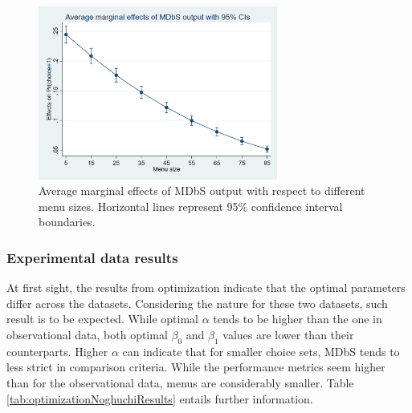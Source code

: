 \documentclass[a4paper,12pt]{article}
\begin{document}
\begin{figure}[h]
    \centering
    \includegraphics[width=0.7\textwidth]{staticFiles/marginsAmadeusGraph.png}
    \caption{Average marginal effects of MDbS output with respect to different menu sizes. Horizontal lines represent 95\% confidence interval boundaries.} %
    \label{fig:marginsAmadeusGraph} %

\end{figure}

\subsubsection{Experimental data results}

At first sight, the results from optimization indicate that the optimal parameters differ across the datasets. Considering the nature for these two datasets, such result is to be expected. While optimal $\alpha$ tends to be higher than the one in observational data, both optimal $\beta_0$ and $\beta_1$ values are lower than their counterparts. Higher $\alpha$ can indicate that for smaller choice sets, MDbS tends to less strict in comparison criteria. While the performance metrics seem higher than for the observational data, menus are considerably smaller. Table \ref{tab:optimizationNoghuchiResults} entails further information.
\end{document}
